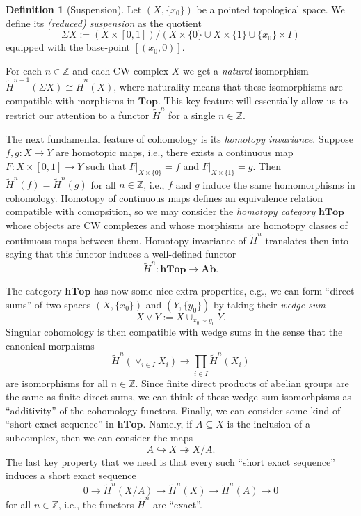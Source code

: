 \documentclass[12pt,a4paper]{amsart}
\theoremstyle{plain}
\theoremstyle{definition}
\newtheorem{defn}[thm]{Definition}
\theoremstyle{remark}
\begin{document}
\begin{defn}[Suspension]
  Let $(X,\{ x_{0} \})$ be a pointed topological space.
  We define its \emph{(reduced) suspension} as the quotient
  \[ \Sigma X := (X \times [0,1])/(X \times \{ 0 \} \cup X \times \{ 1 \} \cup \{ x_{0} \} \times I) \]
  equipped with the base-point $[(x_{0},0)]$.
\end{defn}

For each $n \in \mathbb{Z}$ and each CW complex $X$ we get a \emph{natural} isomorphism $\tilde{H}^{n+1}(\Sigma X) \cong \tilde{H}^{n}(X)$, where naturality means that these isomorphisms are compatible with morphisms in $\mathbf{Top}$.
This key feature will essentially allow us to restrict our attention to a functor $\tilde{H}^{n}$ for a single $n \in \mathbb{Z}$.

The next fundamental feature of cohomology is its \emph{homotopy invariance}.
Suppose $f, g \colon X \to Y$ are homotopic maps, i.e., there exists a continuous map $F \colon X \times [0,1] \to Y$ such that $F|_{X \times \{ 0 \}} = f$ and $F|_{X \times \{ 1 \}} = g$.
Then $\tilde{H}^{n}(f) = \tilde{H}^{n}(g)$ for all $n \in \mathbb{Z}$, i.e., $f$ and $g$ induce the same homomorphisms in cohomology.
Homotopy of continuous maps defines an equivalence relation compatible with comopsition, so we may consider the \emph{homotopy category} $\mathbf{hTop}$ whose objects are CW complexes and whose morphisms are homotopy classes of continuous maps between them.
Homotopy invariance of $\tilde{H}^{n}$ translates then into saying that this functor induces a well-defined functor
\[ \tilde{H}^{n} \colon \mathbf{hTop} \to \mathbf{Ab}. \]

The category $\mathbf{hTop}$ has now some nice extra properties, e.g., we can form ``direct sums'' of two spaces $(X,\{x_{0}\})$ and $(Y,\{y_{0}\})$ by taking their \emph{wedge sum}
\[ X \vee Y := X \cup_{x_{0} \sim y_{0}} Y. \]
Singular cohomology is then compatible with wedge sums in the sense that the canonical morphisms
\[ \tilde{H}^{n}( \vee_{i\in I} X_{i} ) \to \prod_{i \in I} \tilde{H}^{n}(X_{i}) \]
are isomorphisms for all $n \in \mathbb{Z}$.
Since finite direct products of abelian groups are the same as finite direct sums, we can think of these wedge sum isomorhpisms as ``additivity'' of the cohomology functors.
Finally, we can consider some kind of ``short exact sequence'' in $\mathbf{hTop}$.
Namely, if $A \subseteq X$ is the inclusion of a subcomplex, then we can consider the maps
\[ A \hookrightarrow X \twoheadrightarrow X/A. \]
The last key property that we need is that every such ``short exact sequence'' induces a short exact sequence
\[ 0 \to \tilde{H}^{n}(X/A) \to \tilde{H}^{n}(X) \to \tilde{H}^{n}(A) \to 0 \]
for all $n \in \mathbb{Z}$, i.e., the functors $\tilde{H}^{n}$ are ``exact''.
\end{document}
